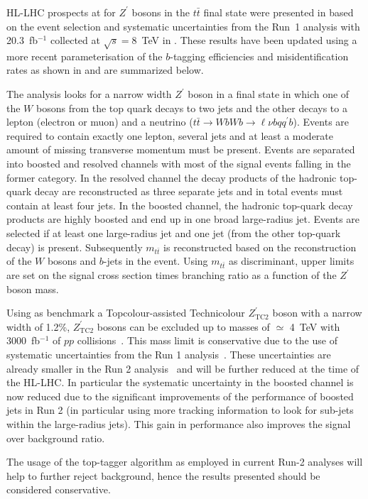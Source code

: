 \subsubsection{}

HL-LHC prospects at for $Z^\prime$ bosons in the $t\bar{t}$ final state were presented in 
based on the event selection and systematic uncertainties from the Run~1 analysis with 20.3~fb$^{-1}$
collected at $\sqrt{s}=8$~TeV in .
These results have been updated using a more recent parameterisation of the $b$-tagging efficiencies and
misidentification rates as shown in  and are summarized below.

The analysis looks for a narrow width $Z^\prime$ boson
in a final state in which one of the $W$ bosons from the top quark decays to two jets and the other decays to a lepton (electron or muon) and a neutrino ($t\bar{t}\rightarrow WbWb \rightarrow \ell \nu b q q^{\prime}b$). Events are required to contain exactly one lepton, several jets and at least a moderate amount of missing transverse momentum must be present. Events are separated into boosted and resolved channels with most of the signal events falling in the former category. In the resolved channel the decay products of the hadronic top-quark decay are reconstructed as three separate jets and in total events must contain at least four jets. In the boosted channel, the hadronic top-quark decay products are highly boosted and end up in one broad large-radius jet. Events are selected if at least one large-radius jet and one jet (from the other top-quark decay) is present.
Subsequently $m_{t\bar{t}}$ is reconstructed based on the reconstruction of the $W$ bosons and $b$-jets in the event. Using $m_{t\bar{t}}$ as discriminant, upper limits are set on the signal cross section times branching ratio as a function of the $Z^\prime$ boson mass.

Using as benchmark a Topcolour-assisted Technicolour $Z^{\prime}_{\mathrm{TC2}}$ boson with a narrow width of 1.2\%, $Z^{\prime}_{\mathrm{TC2}}$ bosons can be excluded up to masses of $\simeq$ 4~TeV with 3000~fb$^{-1}$ of $pp$ collisions~\cite{CERN-LHCC-2017-018}. This mass limit is conservative due to the use of systematic uncertainties from the Run 1 analysis~\cite{Aad:2015fna}. 
These uncertainties are already smaller in the Run 2 analysis~\cite{Aaboud:2018juj} and will be further reduced at the time of the HL-LHC. In particular the systematic uncertainty in the boosted channel is now reduced due to the significant improvements of the performance of boosted jets in Run 2 (in particular using more tracking information to look for sub-jets within the large-radius jets). This gain in performance also improves the signal over background ratio. 

The usage of the top-tagger algorithm as employed in current Run-2 analyses will help to further reject background, hence the results presented should be considered conservative. 
